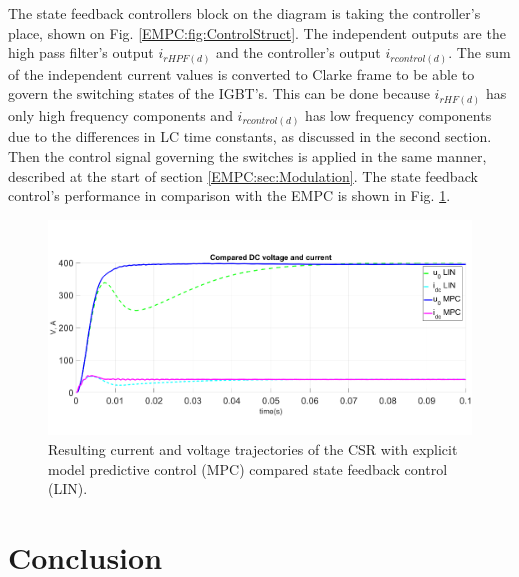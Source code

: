     The state feedback controllers block on the diagram is taking the controller's place, shown on Fig. \ref{EMPC:fig:ControlStruct}. The independent outputs are the high pass filter's output  $i_{rHPF(d)}$ and the controller's output $i_{rcontrol(d)}$. The sum of the independent current values is converted to Clarke frame to be able to govern the switching states of the IGBT's. This can be done because $i_{rHF(d)}$ has only high frequency components and $i_{rcontrol(d)}$ has low frequency components due to the differences in LC time constants, as discussed in the second section. Then the control signal governing the switches is applied in the same manner, described at the start of section \ref{EMPC:sec:Modulation}.
    The state feedback control's performance in comparison with the EMPC is shown in Fig. \ref{EMPC:fig:Result_EMPCfinal}.

    \begin{figure}[!ht]
        \centering
        \includegraphics[width=\textwidth]{EMPC_PNG_Pics/Result_EMPCfinal.png}
        \caption{Resulting current and voltage trajectories of the CSR with explicit model predictive control (MPC) compared state feedback control (LIN).}
        \label{EMPC:fig:Result_EMPCfinal}
    \end{figure}

\section{Conclusion}\label{EMPC:sec:Conclusion}

